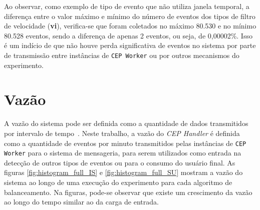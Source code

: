 Ao observar, como exemplo de tipo de evento que não utiliza janela temporal, a diferença entre o valor máximo e mínimo do número de eventos dos tipos de filtro de velocidade (\textbf{vi}), verifica-se que foram coletados no máximo 80.530 e no mínimo 80.528 eventos, sendo a diferença de apenas 2 eventos, ou seja, de 0,00002\%. Isso é um indício de que não houve perda significativa de eventos no sistema por parte de transmissão entre instâncias de \texttt{CEP Worker} ou por outros mecanismos do experimento.











\section{Vazão}
\label{sec:vazao}

A vazão do sistema pode ser definida como a quantidade de dados transmitidos por intervalo de tempo~\citep{bukh1992art}. Neste trabalho, a vazão do \textit{CEP Handler} é definida como a quantidade de eventos por minuto transmitidos pelas instâncias de \texttt{CEP Worker} para o sistema de mensageria, para serem utilizados como entrada na detecção de outros tipos de eventos ou para o consumo do usuário final. %
As figuras \ref{fig:histogram_full_IS} e \ref{fig:histogram_full_SU} mostram a vazão do sistema ao longo de uma execução do experimento para cada algoritmo de balanceamento. Na figuras, pode-se observar que existe um crescimento da vazão ao longo do tempo similar ao da carga de entrada. 


